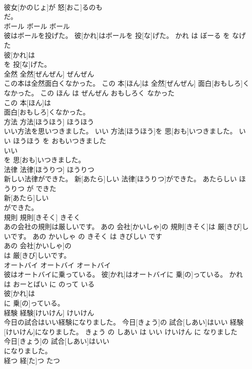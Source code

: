 \documentclass[8pt]{extreport}
\begin{document}
\begin{CJK}{UTF8}{min}
\\	彼女[かのじょ]が 怒[おこ]るのも
\\	だ。			
\\	ボール	ボール	ボール	
\\	彼はボールを投げた。	彼[かれ]はボールを 投[な]げた。	かれ は ぼーる を なげた	
\\	彼[かれ]は
\\	を 投[な]げた。			
\\	全然	全然[ぜんぜん]	ぜんぜん	
\\	この本は全然面白くなかった。	この 本[ほん]は 全然[ぜんぜん] 面白[おもしろ]くなかった。	この ほん は ぜんぜん おもしろく なかった	
\\	この 本[ほん]は
\\	面白[おもしろ]くなかった。			
\\	方法	方法[ほうほう]	ほうほう	
\\	いい方法を思いつきました。	いい 方法[ほうほう]を 思[おも]いつきました。	いい ほうほう を おもいつきました	
\\	いい
\\	を 思[おも]いつきました。			
\\	法律	法律[ほうりつ]	ほうりつ	
\\	新しい法律ができた。	新[あたら]しい 法律[ほうりつ]ができた。	あたらしい ほうりつ が できた	
\\	新[あたら]しい
\\	ができた。			
\\	規則	規則[きそく]	きそく	
\\	あの会社の規則は厳しいです。	あの 会社[かいしゃ]の 規則[きそく]は 厳[きび]しいです。	あの かいしゃ の きそく は きびしい です	
\\	あの 会社[かいしゃ]の
\\	は 厳[きび]しいです。			
\\	オートバイ	オートバイ	オートバイ	
\\	彼はオートバイに乗っている。	彼[かれ]はオートバイに 乗[の]っている。	かれ は おーとばい に のって いる	
\\	彼[かれ]は
\\	に 乗[の]っている。			
\\	経験	経験[けいけん]	けいけん	
\\	今日の試合はいい経験になりました。	今日[きょう]の 試合[しあい]はいい 経験[けいけん]になりました。	きょう の しあい は いい けいけん に なりました	
\\	今日[きょう]の 試合[しあい]はいい
\\	になりました。			
\\	経つ	経[た]つ	たつ	

\end{CJK}
\end{document}
